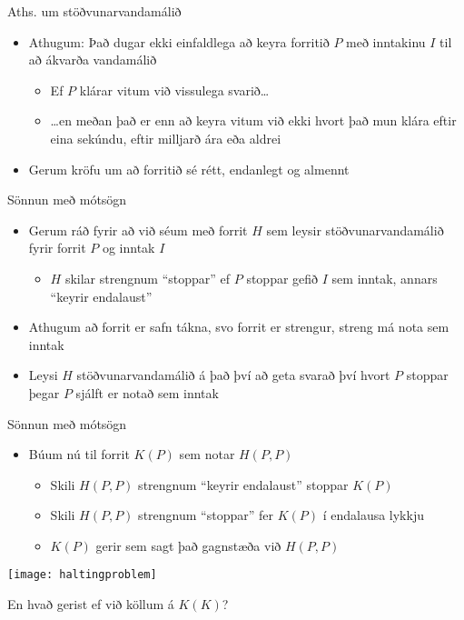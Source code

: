 \documentclass[handout]{beamer}
\begin{document}
\begin{frame}{Aths. um stöðvunarvandamálið}
    \begin{itemize}
    \item Athugum: Það dugar ekki einfaldlega að keyra forritið $P$ með inntakinu $I$ til að ákvarða vandamálið
    \begin{itemize}
    \item Ef $P$ klárar vitum við vissulega svarið\ldots
    \item \ldots en meðan það er enn að keyra vitum við ekki hvort það mun klára eftir eina sekúndu, eftir milljarð ára eða aldrei
    \end{itemize}
    \item Gerum kröfu um að forritið sé rétt, endanlegt og almennt
    \end{itemize}
\end{frame}

\begin{frame}{Sönnun með mótsögn}
\begin{itemize}
 \item Gerum ráð fyrir að við séum með forrit $H$ sem leysir stöðvunarvandamálið fyrir forrit $P$ og inntak $I$
 \begin{itemize}
  \item $H$ skilar strengnum ``stoppar'' ef $P$ stoppar gefið $I$ sem inntak, annars ``keyrir endalaust'' \pause
 \end{itemize}
 \item Athugum að forrit er safn tákna, svo forrit er strengur, streng má nota sem inntak
 \item Leysi $H$ stöðvunarvandamálið á það því að geta svarað því hvort $P$ stoppar þegar $P$ sjálft er notað sem inntak
\end{itemize}
\end{frame}

\begin{frame}{Sönnun með mótsögn}
\begin{itemize}
 \item Búum nú til forrit $K(P)$ sem notar $H(P, P)$
 \begin{itemize}
  \item Skili $H(P, P)$ strengnum ``keyrir endalaust'' stoppar $K(P)$ 
  \item Skili $H(P, P)$ strengnum ``stoppar'' fer $K(P)$ í endalausa lykkju
  \item $K(P)$ gerir sem sagt það gagnstæða við $H(P, P)$
 \end{itemize}
\end{itemize}
\texttt{[image: haltingproblem]}

\pause
En hvað gerist ef við köllum á $K(K)$?
\end{frame}
\end{document}
